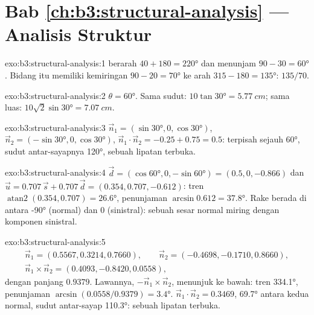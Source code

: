 \section*{Bab \ref{ch:b3:structural-analysis} --- Analisis Struktur}

\begin{solution}{exo:b3:structural-analysis:1}
 berarah $40 + 180 = \ang{220}$ dan menunjam $90 - 30 = \ang{60}$.
Bidang itu memiliki kemiringan $90 - 20 = \ang{70}$ ke arah $315 - 180 = \ang{135}$: $135/70$.
\end{solution}

\begin{solution}{exo:b3:structural-analysis:2}
$\theta = \ang{60}$. Sama sudut: $10\tan\ang{30} = \qty{5.77}{cm}$;
sama luas: $10\sqrt2\sin\ang{30} = \qty{7.07}{cm}$.
\end{solution}

\begin{solution}{exo:b3:structural-analysis:3}
$\vec n_1 = (\sin\ang{30}, 0, \cos\ang{30})$, $\vec n_2 = (-\sin\ang{30}, 0,
\cos\ang{30})$, $\vec n_1\cdot\vec n_2 = -0.25 + 0.75 = 0.5$: 
terpisah sejauh \ang{60}, sudut antar-sayapnya \ang{120}, sebuah lipatan terbuka.
\end{solution}

\begin{solution}{exo:b3:structural-analysis:4}
$\vec d = (\cos\ang{60}, 0, -\sin\ang{60}) = (0.5, 0, -0.866)$ dan $\vec u =
0.707\,\vec s + 0.707\,\vec d = (0.354, 0.707, -0.612)$: tren
$\operatorname{atan2}(0.354, 0.707) = \ang{26.6}$, penunjaman $\arcsin0.612 =
\ang{37.8}$. Rake berada di antara \ang{-90} (normal) dan 0 (sinistral): sebuah
sesar normal miring dengan komponen sinistral.
\end{solution}

\begin{solution}{exo:b3:structural-analysis:5}
\begin{gather*}
  \vec n_1 = (0.5567, 0.3214, 0.7660),\qquad \vec n_2 = (-0.4698, -0.1710, 0.8660),\\
  \vec n_1\times\vec n_2 = (0.4093, -0.8420, 0.0558),
\end{gather*}
dengan panjang $0.9379$. Lawannya, $-\vec n_1\times\vec n_2$, menunjuk ke bawah:
tren \ang{334.1}, penunjaman $\arcsin(0.0558/0.9379) = \ang{3.4}$. $\vec n_1\cdot\vec
n_2 = 0.3469$, \ang{69.7} antara kedua normal, sudut antar-sayap \ang{110.3}:
sebuah lipatan terbuka.
\end{solution}

